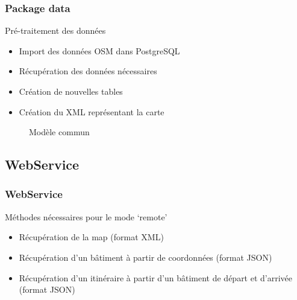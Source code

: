 \documentclass{beamer}
\begin{document}
\begin{frame}
\frametitle{Package data}
\begin{block}{Pré-traitement des données}
\begin{itemize}
\item Import des données OSM dans PostgreSQL
\item Récupération des données nécessaires
\item Création de nouvelles tables
\item Création du XML représentant la carte
\end{itemize}
\end{block}
\end{frame}

\begin{frame}
\begin{figure}
\centering
{}
\caption{Modèle commun}
\end{figure}
\end{frame}


\subsection{WebService}
\begin{frame}
\frametitle{WebService}
\begin{block}{Méthodes nécessaires pour le mode `remote'}
\begin{itemize}
\item Récupération de la map (format XML)
\item Récupération d'un bâtiment à partir de coordonnées (format JSON)
\item Récupération d'un itinéraire à partir d'un bâtiment de départ et d'arrivée (format JSON)
\end{itemize}
\end{block}
\end{frame}
\end{document}
